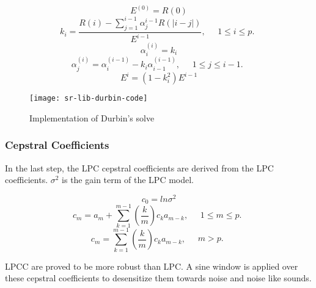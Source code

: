 \begin{equation*} E^{(0)} = R(0) \end{equation*}
\begin{equation*} k_i = \dfrac{R(i) - \sum_{j=1}^{i-1}\alpha_j^{i-1}R(|i-j|)}{E^{i-1}},  \quad \begin{aligned} 1 \leq i \leq p. \end{aligned} \end{equation*}
\begin{equation*} \alpha_i^{(i)} = k_i \end{equation*}
\begin{equation*}\alpha_j^{(i)} = \alpha_i^{(i-1)} - k_i\alpha_{i-1}^{(i-1)},   \quad \begin{aligned} 1 \leq j \leq i-1. \end{aligned}\end{equation*}
\begin{equation*} E^{i} = (1-k_i^2)E^{i-1} \end{equation*}

\begin{figure}[h!]
    \centering
    \texttt{[image: sr-lib-durbin-code]}
    \label{fig:sr-lib-durbin-code}
    \caption{Implementation of Durbin's solve}
\end{figure}

\subsubsection{Cepstral Coefficients}
In the last step, the LPC cepstral coefficients are derived from the LPC coefficients. $\sigma^2$ is the gain term of the LPC model.

\begin{equation*}
    c_0 = ln\sigma^2
\end{equation*}
\begin{equation*}
    c_m = a_m + \sum_{k = 1}^{m - 1}(\frac{k}{m})c_ka_{m-k}, 
    \quad \begin{aligned} 1 \leq m \leq p. \end{aligned}
\end{equation*}
\begin{equation*}
    c_m = \sum_{k = 1}^{m - 1}(\frac{k}{m})c_ka_{m-k}, 
    \quad \begin{aligned} m > p. \end{aligned}
\end{equation*}

LPCC are proved to be more robust than LPC. A sine window is applied over these cepstral coefficients to desensitize them towards noise and noise like sounds.


